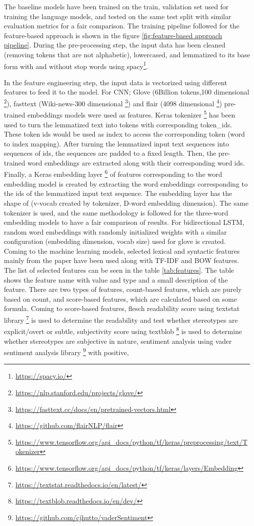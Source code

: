 The baseline models have been trained on the train, validation set used for training the language models, and tested on the same test split with similar evaluation metrics for a fair comparison. The training pipeline followed for the feature-based approach is shown in the figure \ref{fig:feature-based approach pipeline}. During the pre-processing step, the input data has been cleaned (removing tokens that are not alphabetic), lowercased, and lemmatized to its base form with and without stop words using spacy\footnote{\url{https://spacy.io/}}. 


In the feature engineering step, the input data is vectorized using different features to feed it to the model. For CNN; Glove (6Billion tokens,100 dimensional \footnote{\url{https://nlp.stanford.edu/projects/glove/}}), fasttext (Wiki-news-300 dimensional \footnote{\url{https://fasttext.cc/docs/en/pretrained-vectors.html}}) and flair (4098 dimensional \footnote{\url{https://github.com/flairNLP/flair}}) pre-trained embeddings models were used as features. Keras tokenizer \footnote{\url{https://www.tensorflow.org/api_docs/python/tf/keras/preprocessing/text/Tokenizer}} has been used to turn the lemmatized text into tokens with corresponding token\_ids. These token ids would be used as index to access the corresponding token (word to index mapping). After turning the lemmatized input text sequences into sequences of ids, the sequences are padded to a fixed length. Then, the pre-trained word embeddings are extracted along with their corresponding word ids. Finally, a Keras embedding layer \footnote{\url{https://www.tensorflow.org/api_docs/python/tf/keras/layers/Embedding}} of features corresponding to the word embedding model is created by extracting the word embeddings corresponding to the ids of the lemmatized input text sequence. The embedding layer has the shape of (v-vocab created by tokenizer, D-word embedding dimension). The same tokenizer is used, and the same methodology is followed for the three-word embedding models to have a fair comparison of results. For bidirectional LSTM, random word embeddings with randomly initialized weights with a similar configuration (embedding dimension, vocab size) used for glove is created. Coming to the machine learning models, selected lexical and syntactic features mainly from the paper \cite{recasens2013linguistic}  have been used along with TF-IDF and BOW features. The list of selected features can be seen in the table \ref{tab:features}. The table shows the feature name with value and type and a small description of the feature. There are two types of features, count-based features, which are purely based on count, and score-based features, which are calculated based on some formula. Coming to score-based features, flesch readability score \cite{flesch1948new} using textstat library \footnote{\url{https://textstat.readthedocs.io/en/latest/}} is used to determine the readability and test whether stereotypes are explicit/overt or subtle, subjectivity score using textblob \footnote{\url{https://textblob.readthedocs.io/en/dev/}} is used to determine whether stereotypes are subjective in nature, sentiment analysis using vader sentiment analysis library \footnote{\url{https://github.com/cjhutto/vaderSentiment}} with positive, 